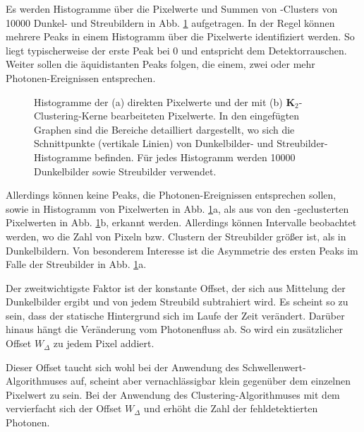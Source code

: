 \noindent
Es werden Histogramme über die Pixelwerte und Summen von -Clusters von \num{10000} Dunkel- und Streubildern in Abb. \ref{fig:no_pr_cl_2_histograms} aufgetragen. In der Regel können mehrere Peaks in einem Histogramm über die Pixelwerte identifiziert werden. So liegt typischerweise der erste Peak bei \SI{0}{\adu} und entspricht dem Detektorrauschen. Weiter sollen die äquidistanten Peaks folgen, die einem, zwei oder mehr Photonen-Ereignissen entsprechen.
\begin{figure}[H]
    \centering
    
    \caption{Histogramme der (a) direkten Pixelwerte und der mit (b) $\mathbf{K}_2$-Clustering-Kerne bearbeiteten Pixelwerte. In den eingefügten Graphen sind die Bereiche detailliert dargestellt, wo sich die Schnittpunkte (vertikale Linien) von Dunkelbilder- und Streubilder-Histogramme befinden. Für jedes Histogramm werden \num{10000} Dunkelbilder sowie Streubilder verwendet.}
    \label{fig:no_pr_cl_2_histograms}
\end{figure}
\noindent
Allerdings können keine Peaks, die Photonen-Ereignissen entsprechen sollen, sowie in Histogramm von Pixelwerten in Abb. \ref{fig:no_pr_cl_2_histograms}a, als aus von den -geclusterten Pixelwerten in Abb. \ref{fig:no_pr_cl_2_histograms}b, erkannt werden. Allerdings können Intervalle beobachtet werden, wo die Zahl von Pixeln bzw. Clustern der Streubilder größer ist, als in Dunkelbildern. Von besonderem Interesse ist die Asymmetrie des ersten Peaks im Falle der Streubilder in Abb. \ref{fig:no_pr_cl_2_histograms}a.

\noindent
Der zweitwichtigste Faktor ist der konstante Offset, der sich aus Mittelung der Dunkelbilder ergibt und von jedem Streubild subtrahiert wird. Es scheint so zu sein, dass der statische Hintergrund sich im Laufe der Zeit verändert. Darüber hinaus hängt die Veränderung vom Photonenfluss ab. So wird ein zusätzlicher Offset $W_\Delta$ zu jedem Pixel addiert.

\noindent
Dieser Offset taucht sich wohl bei der Anwendung des Schwellenwert-Algorithmuses auf, scheint aber vernachlässigbar klein gegenüber dem einzelnen Pixelwert zu sein. Bei der Anwendung des Clustering-Algorithmuses mit dem  vervierfacht sich der Offset $W_\Delta$ und erhöht die Zahl der fehldetektierten Photonen.

